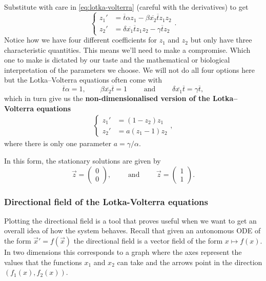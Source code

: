 Substitute with care in \ref{eq:lotka-volterra} (careful with the derivatives) to get
\[
  \begin{cases}
    z_1' &= \overline{t} \alpha z_1 - \beta \overline{x_2} \overline{t} z_1 z_2 \\
    z_2' &= \delta \overline{x_1}\overline{t} z_1 z_2 - \gamma \overline{t} z_2
  \end{cases}.
\]
Notice how we have four different coefficients for $z_1$ and $z_2$ but only
have three characteristic quantities. This means we'll need to make a
compromise. Which one to make is dictated by our taste and the mathematical or
biological interpretation of the parameters we choose. We will not do all four
options here but the Lotka--Volterra equations often come with
\[
  \overline{t} \alpha = 1,
  \qquad \beta \overline{x_2} \overline{t} = 1 \qquad \text{ and } \qquad
  \delta \overline{x_1} \overline{t} = \gamma \overline{t},
\]
which in turn give us the \textbf{non-dimensionalised version of the
Lotka--Volterra equations}
\begin{align}
  \label{eq:non-dim-lotka-volterra}
  \begin{cases}
    z_1' &= (1 - z_2) z_1 \\
    z_2' &= a (z_1 - 1) z_2
  \end{cases},
\end{align}
where there is only one parameter $a = \gamma / \alpha$. 

In this form, the stationary solutions are given by
\[
  \vec{z} = \left(\begin{array}{c}0 \\ 0\end{array}\right),
  \qquad \text{ and }\qquad
  \vec{z} = \left(\begin{array}{c}1 \\ 1\end{array}\right).
\]


\subsubsection{Directional field of the Lotka-Volterra equations}

Plotting the directional field is a tool that proves useful when we want to get
an overall idea of how the system behaves. Recall that given an autonomous ODE
of the form $\vec{x}' = f(\vec{x})$ the directional field is a vector field of
the form $x \mapsto f(x)$. In two dimensions this corresponds to a graph where
the axes represent the values that the functions $x_1$ and $x_2$ can take and
the arrows point in the direction $(f_1(x), f_2(x))$.

